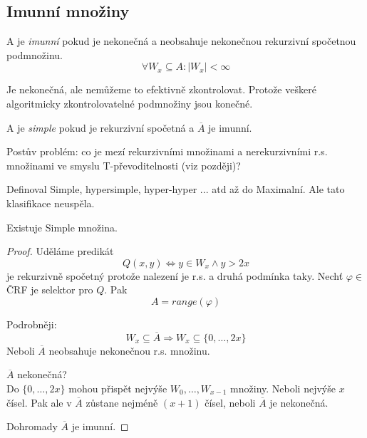 \subsection{Imunní množiny}

\begin{definition}
	A je \emph{imunní} pokud je nekonečná a neobsahuje nekonečnou rekurzivní spočetnou podmnožinu.
	\[ \forall W_x \subseteq A : |W_x| < \infty \]

	Je nekonečná, ale nemůžeme to efektivně zkontrolovat.
	Protože veškeré algoritmicky zkontrolovatelné podmnožiny jsou konečné.
\end{definition}

\begin{definition}[Simple]
	A je \emph{simple} pokud je rekurzivní spočetná a $\overline{A}$ je imunní.
\end{definition}

\begin{note}
	Postův problém: co je mezí rekurzivními množinami a nerekurzivními r.s. množinami ve smyslu T-převoditelnosti (viz později)?

	Definoval Simple, hypersimple, hyper-hyper ... atd až do Maximalní.
	Ale tato klasifikace neuspěla.
\end{note}

\begin{theorem}
	Existuje Simple množina.
\end{theorem}
\begin{proof}
	Uděláme predikát
	\[ Q(x, y) \iff y \in W_x \land y > 2x \]
	je rekurzivně spočetný protože nalezení je r.s. a druhá podmínka taky.
	Nechť $\varphi \in $ ČRF je selektor pro $Q$.
	Pak
	\[ A = range(\varphi) \]

	Podrobněji:
	\[ W_x \subseteq \overline{A} \Rightarrow W_x \subseteq \{ 0, \ldots, 2x \} \]
	Neboli $\overline{A}$ neobsahuje nekonečnou r.s. množinu.

	$\overline{A}$ nekonečná? \\
	Do $\{ 0, \ldots, 2x \}$ mohou přispět nejvýše $W_0, \ldots, W_{x - 1}$ množiny.
	Neboli nejvýše $x$ čísel.
	Pak ale v $\overline{A}$ zůstane nejméně $(x + 1)$ čísel, neboli $\overline{A}$ je nekonečná.

	Dohromady $\overline{A}$ je imunní.

\end{proof}
